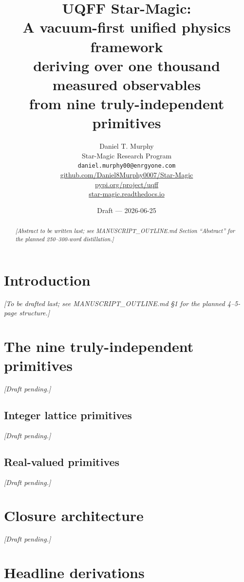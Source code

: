 \documentclass[12pt,a4paper]{article}
\title{\textbf{UQFF Star-Magic:\\
A vacuum-first unified physics framework\\
deriving over one thousand measured observables\\
from nine truly-independent primitives}}
\author{%
Daniel T. Murphy \\[3pt]
\small Star-Magic Research Program \\
\small \texttt{daniel.murphy00@enrgyone.com}\\
\small \href{https://github.com/Daniel8Murphy0007/Star-Magic}{github.com/Daniel8Murphy0007/Star-Magic} \\
\small \href{https://pypi.org/project/uqff/}{pypi.org/project/uqff} \\
\small \href{https://star-magic.readthedocs.io/}{star-magic.readthedocs.io}}
\date{Draft --- 2026-06-25}
\begin{document}
\maketitle

\begin{abstract}
\textit{[Abstract to be written last; see MANUSCRIPT\_OUTLINE.md Section ``Abstract'' for the planned 250--300-word distillation.]}
\end{abstract}

\section{Introduction}
\label{sec:intro}
\textit{[To be drafted last; see MANUSCRIPT\_OUTLINE.md \S1 for the planned 4--5-page structure.]}

\section{The nine truly-independent primitives}
\label{sec:primitives}
\textit{[Draft pending.]}
\subsection{Integer lattice primitives}\label{sec:integer_primitives}\textit{[Draft pending.]}
\subsection{Real-valued primitives}\label{sec:real_primitives}\textit{[Draft pending.]}

\section{Closure architecture}
\label{sec:architecture}
\textit{[Draft pending.]}

\section{Headline derivations}
\label{sec:headline}








\end{document}
